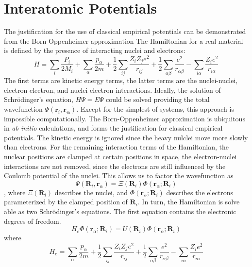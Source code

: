 \section{Interatomic Potentials}
The justification for the use of classical empirical potentials can be demonstrated from the Born-Oppenheimer approximation\cite{born1927_bo}  The Hamiltonian for a real material is defined by the presence of interacting nuclei and electrons:
\begin{equation}
	H = \sum_i \frac{P_i}{2M_i}
	    + \sum_\alpha \frac{p_\alpha}{2m}
	    + \frac{1}{2} \sum_{ij} \frac{Z_i Z_j e^2}{r_{ij}}
	    + \frac{1}{2} \sum_{\alpha\beta} \frac{e^2}{r_{\alpha\beta}}
	    - \sum_{i\alpha} \frac{Z_i e^2}{r_{i\alpha}}
\end{equation}
The first terms are kinetic energy terms, the latter terms are the nuclei-nuclei, electron-electron, and nuclei-electron interactions.  Ideally, the solution of Schr\"{o}dinger's equation, $H\Psi=E\Psi$ could be solved providing the total wavefunction $\Psi(\bm{r}_i,\bm{r_\alpha})$.  Except for the simplest of systems, this approach is impossible computationally.
The Born-Oppenheimer approximation \cite{born1927_bo} is ubiquitous in \emph{ab initio} calculations, and forms the justification for classical empirical potentials.  The kinetic energy is ignored since the heavy nulclei move more slowly than electrons.  For the remaining interaction terms of the Hamiltonian, the nuclear positions are clamped at certain positions in space, the electron-nuclei interactions are not removed, since the electrons are still influenced by the Coulomb potential of the nuclei.  This allows us to factor the wavefunction as
\begin{equation}
	\Psi(\bm{R}_i,\bm{r}_\alpha) = \Xi(\bm{R}_i)\Phi(\bm{r}_\alpha;\bm{R}_i)
\end{equation},
where $\Xi(\bm{R}_i)$ describes the nuclei, and $\Phi(\bm{r}_\alpha;\bm{R}_i)$ describes the electrons parameterized by the clamped position of $\bm{R}_i$.  In turn, the Hamiltonian is solve able as two Schr\"{o}dinger's equations.  The first equation contains the electronic degrees of freedom.
\begin{equation}
\label{eq:BO_electronic}
     H_{e}\Phi(\bm{r}_\alpha;\bm{R}_i)=U(\bm{R}_i)\Phi(\bm{r}_\alpha;\bm{R}_i)
\end{equation}
where
\begin{equation}
	H_e = \sum_\alpha \frac{p_\alpha}{2m}
	      + \frac{1}{2} \sum_{ij} \frac{Z_i Z_j e^2}{r_{ij}}
	      + \frac{1}{2} \sum_{\alpha\beta} \frac{e^2}{r_{\alpha\beta}}
	      - \sum_{i\alpha} \frac{Z_i e^2}{r_{i\alpha}}
\end{equation}
